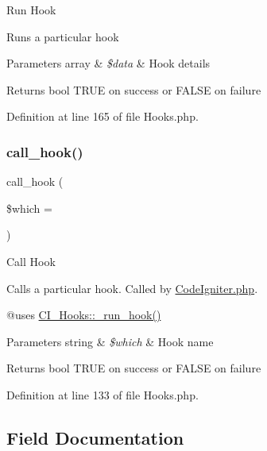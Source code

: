 Run Hook

Runs a particular hook


\begin{DoxyParams}[1]{Parameters}
array & {\em \$data} & Hook details \\
\hline
\end{DoxyParams}
\begin{DoxyReturn}{Returns}
bool T\+R\+UE on success or F\+A\+L\+SE on failure 
\end{DoxyReturn}


Definition at line 165 of file Hooks.\+php.

\mbox{\label{class_c_i___hooks_a470d397aaf24f1ca3ef73021ad03492b}} 
\subsubsection{\texorpdfstring{call\_hook()}{call\_hook()}}
{\footnotesize\ttfamily call\+\_\+hook (\begin{DoxyParamCaption}\item[{}]{\$which = {\ttfamily \textquotesingle{}\textquotesingle{}} }\end{DoxyParamCaption})}

Call Hook

Calls a particular hook. Called by \mbox{\hyperlink{_code_igniter_8php}{Code\+Igniter.\+php}}.

@uses \mbox{\hyperlink{class_c_i___hooks_a2cd07b3fcfaf153a37f164d3fbc7c3d9}{C\+I\+\_\+\+Hooks\+::\+\_\+run\+\_\+hook()}}


\begin{DoxyParams}[1]{Parameters}
string & {\em \$which} & Hook name \\
\hline
\end{DoxyParams}
\begin{DoxyReturn}{Returns}
bool T\+R\+UE on success or F\+A\+L\+SE on failure 
\end{DoxyReturn}


Definition at line 133 of file Hooks.\+php.



\subsection{Field Documentation}
\mbox{\label{class_c_i___hooks_a6e8d0edcf7a4fb3e76c0f6d00e70053e}} 
